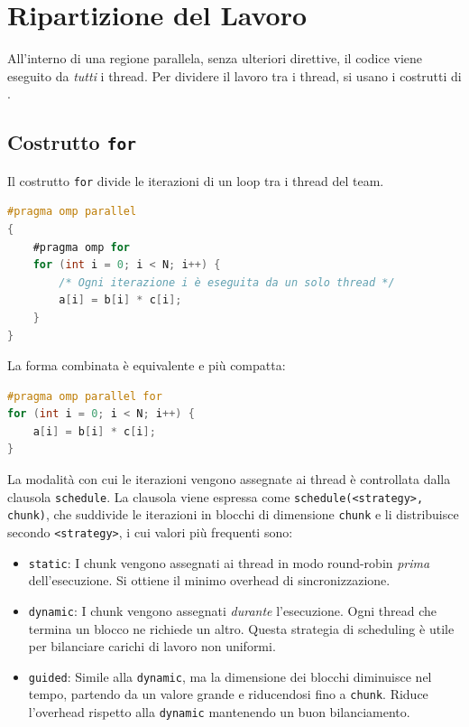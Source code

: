 \section{Ripartizione del Lavoro}
All'interno di una regione parallela, senza ulteriori direttive, il codice viene eseguito da \emph{tutti} i thread. 
Per dividere il lavoro tra i thread, si usano i costrutti di .

\subsection{Costrutto \texttt{for}}
Il costrutto \texttt{for} divide le iterazioni di un loop tra i thread del team.
\begin{lstlisting}[language=C, numbers=none]
#pragma omp parallel
{
    #pragma omp for
    for (int i = 0; i < N; i++) {
        /* Ogni iterazione i è eseguita da un solo thread */
        a[i] = b[i] * c[i];
    }
}
\end{lstlisting}
La forma combinata è equivalente e più compatta:
\begin{lstlisting}[language=C, numbers=none]
#pragma omp parallel for
for (int i = 0; i < N; i++) {
    a[i] = b[i] * c[i];
}
\end{lstlisting}

\noindent
La modalità con cui le iterazioni vengono assegnate ai thread è controllata dalla clausola \texttt{schedule}. 
La clausola viene espressa come \texttt{schedule(<strategy>, chunk)}, che suddivide le iterazioni in blocchi di dimensione \texttt{chunk} e li distribuisce secondo \texttt{<strategy>}, i cui valori più frequenti sono:
\begin{itemize}
    \item \texttt{static}: I chunk vengono assegnati ai thread in modo round-robin \emph{prima} dell'esecuzione. Si ottiene il minimo overhead di sincronizzazione.
    \item \texttt{dynamic}: I chunk vengono assegnati \emph{durante} l'esecuzione. Ogni thread che termina un blocco ne richiede un altro. Questa strategia di scheduling è utile per bilanciare carichi di lavoro non uniformi.
    \item \texttt{guided}: Simile alla \texttt{dynamic}, ma la dimensione dei blocchi diminuisce nel tempo, partendo da un valore grande e riducendosi fino a \texttt{chunk}. Riduce l'overhead rispetto alla \texttt{dynamic} mantenendo un buon bilanciamento.
\end{itemize}

